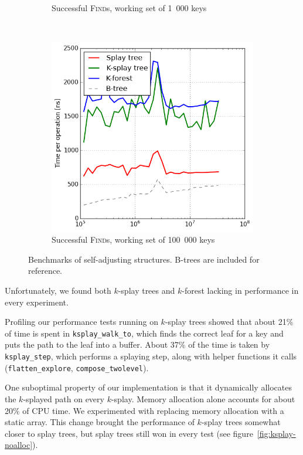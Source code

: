 \begin{figure}
\begin{subfigure}[t]{0.31\textwidth}
	\caption{Successful \textsc{Find}s, working set of 1~000 keys}
	\label{fig:sub:self-adj-ws-1k}
\end{subfigure}
~
\begin{subfigure}[t]{0.31\textwidth}
	\includegraphics[width=\textwidth]{img/performance/self-adj-ws-100k}
	\caption{Successful \textsc{Find}s, working set of 100~000 keys}
	\label{fig:sub:self-adj-ws-100k}
\end{subfigure}
\caption{Benchmarks of self-adjusting structures.
	B-trees are included for reference.}
\label{fig:self-adj-performance}
\end{figure}

Unfortunately, we found both $k$-splay trees and $k$-forest lacking in
performance in every experiment.

Profiling our performance tests running on $k$-splay trees showed that about
21\% of time is spent in \texttt{ksplay\_walk\_to}, which finds the correct
leaf for a key and puts the path to the leaf into a buffer. About 37\% of the
time is taken by \texttt{ksplay\_step}, which performs a splaying step, along
with helper functions it calls (\texttt{flatten\_explore},
\texttt{compose\_twolevel}).

One suboptimal property of our implementation is that it dynamically
allocates the $k$-splayed path on every $k$-splay. Memory allocation alone
accounts for about 20\% of CPU time.
We experimented with replacing memory allocation with a static array.
This change brought the performance of $k$-splay trees somewhat closer to
splay trees, but splay trees still won in every test
(see figure~\ref{fig:ksplay-noalloc}).

